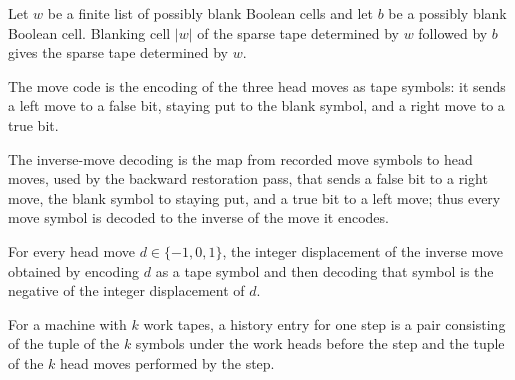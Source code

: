 \begin{lemma}
\label{Complexity.enumCont_sparse_erase}
\leanok
{}
Let $w$ be a finite list of possibly blank Boolean cells and let $b$ be a possibly blank
Boolean cell. Blanking cell $|w|$ of the sparse tape determined by $w$ followed by $b$
gives the sparse tape determined by $w$.
\end{lemma}

\begin{definition}
\label{Complexity.enumCont_moveCode}
\leanok
The move code is the encoding of the three head moves as tape symbols: it sends a
left move to a false bit, staying put to the blank symbol, and a right move to a
true bit.
\end{definition}

\begin{definition}
\label{Complexity.enumCont_unmove}
\leanok
The inverse-move decoding is the map from recorded move symbols to head moves,
used by the backward restoration pass, that sends a false bit to a right move, the
blank symbol to staying put, and a true bit to a left move; thus every move symbol
is decoded to the inverse of the move it encodes.
\end{definition}

\begin{lemma}
\label{Complexity.enumCont_unmove_cast}
\leanok
{}
For every head move $d\in\{-1,0,1\}$, the integer displacement of the inverse move
obtained by encoding $d$ as a tape symbol and then decoding that symbol is the negative
of the integer displacement of $d$.
\end{lemma}

\begin{definition}
\label{Complexity.EnumContEntry}
\leanok
For a machine with $k$ work tapes, a history entry for one step is a pair
consisting of the tuple of the $k$ symbols under the work heads before the step
and the tuple of the $k$ head moves performed by the step.
\end{definition}

